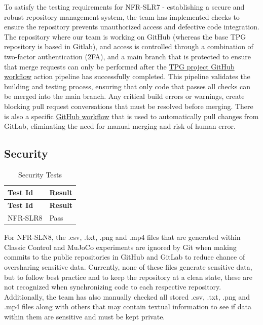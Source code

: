 \documentclass[12pt, titlepage]{article}
\begin{document}
To satisfy the testing requirements for NFR-SLR7 - establishing a secure and robust repository management system, the team has implemented checks to ensure the repository prevents unauthorized access and defective code integration. The repository where our team is working on GitHub (whereas the base TPG repository is based in Gitlab), and access is controlled through a combination of two-factor authentication (2FA), and a main branch that is protected to ensure that merge requests can only be performed after the \href{https://github.com/TPGEngine/tpg/blob/main/.github/workflows/build-project.yaml}{TPG project GitHub workflow} action pipeline has successfully completed. This pipeline validates the building and testing process, ensuring that only code that passes all checks can be merged into the main branch. Any critical build errors or warnings, create blocking pull request conversations that must be resolved before merging. There is also a specific \href{https://github.com/TPGEngine/tpg/blob/main/.github/workflows/pull-gitlab.yml}{GitHub workflow} that is used to automatically pull changes from GitLab, eliminating the need for manual merging and risk of human error. 

\subsection{Security}\label{security}

\begin{center}
  \begin{longtable}{|p{4cm}|p{4cm}|}
  \caption{Security Tests} \\
  \hline
  \textbf{Test Id} & \textbf{Result} \\
  \hline
  \endfirsthead
  \hline
  \textbf{Test Id} & \textbf{Result} \\
  \hline
  \endhead
  NFR-SLR8 & Pass \\
  \hline
  \end{longtable}
\end{center}


For NFR-SLN8, the .csv, .txt, .png and .mp4 files that are generated within Classic Control and MuJoCo experiments are ignored by Git when making commits to the public repositories in GitHub and GitLab to reduce chance of oversharing sensitive data. Currently, none of these files generate sensitive data, but to follow best practice and to keep the repository at a clean state, these are not recognized when synchronizing code to each respective repository. Additionally, the team has also manually checked all stored .csv, .txt, .png and .mp4 files along with others that may contain textual information to see if data within them are sensitive and must be kept private. 
\end{document}
